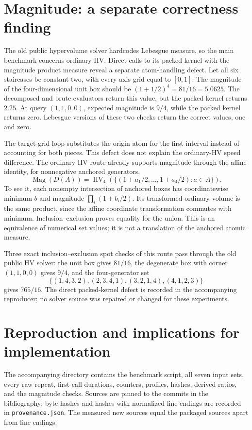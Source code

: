 \documentclass[12pt,a4paper]{article}
\begin{document}
\section{Magnitude: a separate correctness finding}
The old public hypervolume solver hardcodes Lebesgue measure, so the main
benchmark concerns ordinary HV. Direct calls to its packed kernel with the
magnitude product measure reveal a separate atom-handling defect.
Let all six staircases be constant two, with every axis grid equal to $[0,1]$.
The magnitude of the four-dimensional unit box should be
$(1+1/2)^4=81/16=5.0625$. The decomposed and brute evaluators return this value,
but the packed kernel returns $2.25$. At query $(1,1,0,0)$, expected magnitude
is $9/4$, while the packed kernel returns zero. Lebesgue versions of these
two checks return the correct values, one and zero.

The target-grid loop substitutes the origin atom for the first interval
instead of accounting for both pieces. This defect does not explain the
ordinary-HV speed difference. The ordinary-HV route already supports magnitude
through the affine identity, for nonnegative anchored generators,
\[
 \operatorname{Mag}(D(A))=
 \operatorname{HV}_4\!\left(\{(1+a_1/2,\ldots,1+a_4/2):a\in A\}\right).
\]
To see it, each nonempty intersection of anchored boxes has coordinatewise
minimum $b$ and magnitude $\prod_i(1+b_i/2)$. Its transformed ordinary volume
is the same product, since the affine coordinate transformation commutes with
minimum. Inclusion--exclusion proves equality for the union. This is an
equivalence of numerical set values; it is not a translation of the anchored
atomic measure.

Three exact inclusion--exclusion spot checks of this route pass through the
old public HV solver: the unit box gives $81/16$, the degenerate box with
corner $(1,1,0,0)$ gives $9/4$, and the four-generator set
\[
 \{(1,4,3,2),(2,3,4,1),(3,2,1,4),(4,1,2,3)\}
\]
gives $765/16$. The direct packed-kernel defect is recorded in the accompanying
reproducer; no solver source was repaired or changed for these experiments.

\section{Reproduction and implications for implementation}
The accompanying directory contains the benchmark script, all seven input
sets, every raw repeat, first-call durations, counters, profiles, hashes,
derived ratios, and the magnitude checks. Sources are pinned to the commits
in the bibliography; byte hashes and hashes with normalized line endings are
recorded in \texttt{provenance.json}. The measured new sources equal the
packaged sources apart from line endings.
\end{document}
